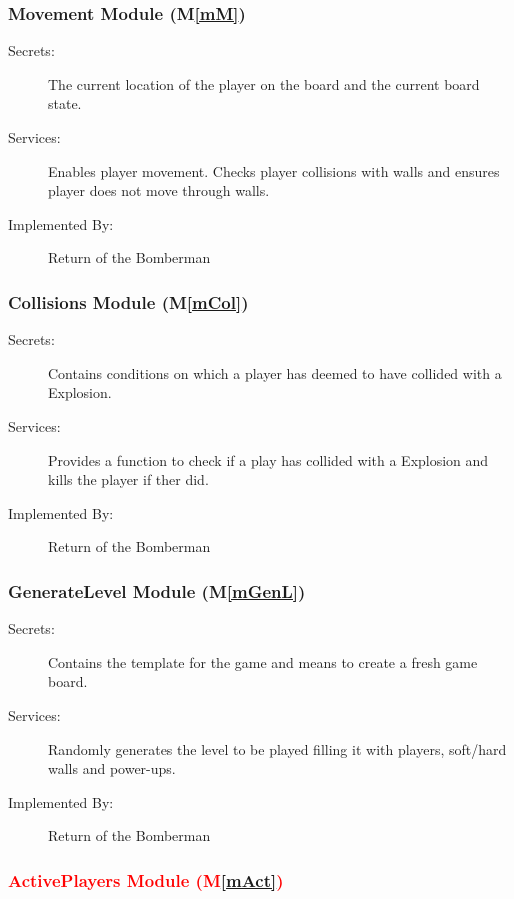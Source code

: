 \documentclass[12pt, titlepage]{article}
\newcommand{\mref}[1]{M\ref{#1}}
\begin{document}
\subsubsection{Movement Module (\mref{mM})}

\begin{description}
\item[Secrets:]The current location of the player on the board and the current board state.
\item[Services:]Enables player movement. Checks player collisions with walls and ensures player does not move through walls.
\item[Implemented By:] Return of the Bomberman
\end{description}

\subsubsection{Collisions Module (\mref{mCol})}

\begin{description}
\item[Secrets:] Contains conditions on which a player has deemed to have collided with a Explosion. 
\item[Services:] Provides a function to check if a play has collided with a Explosion and kills the player if ther did.
\item[Implemented By:] Return of the Bomberman
\end{description}

\subsubsection{GenerateLevel Module (\mref{mGenL})}

\begin{description}
\item[Secrets:] Contains the template for the game and means to create a fresh game board.
\item[Services:] Randomly generates the level to be played filling it with players, soft/hard walls and power-ups.
\item[Implemented By:] Return of the Bomberman
\end{description}


\subsubsection{\textcolor{red}{ActivePlayers Module (\mref{mAct})}}
\end{document}
